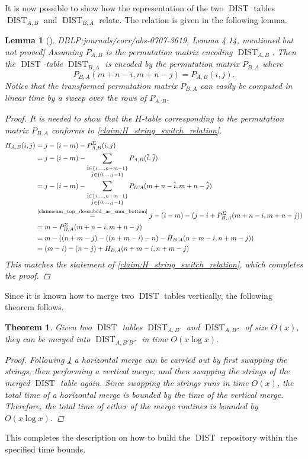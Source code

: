 \documentclass[twoside,11pt,openright]{report}
\newcommand{\DIST}{\operatorname{DIST}}
\newcommand{\refbook}[2]{\cite[#1]{DBLP:journals/corr/abs-0707-3619}, #2}
\newtheorem{lemma}{Lemma}
\newtheorem{theorem}{Theorem}
\begin{document}
%
It is now possible to show how the representation of the two $\DIST$ tables $\DIST_{A,B}$ and $\DIST_{B,A}$ relate. The relation is given in the following lemma.
%
\begin{lemma}[\refbook{p.-52}{Lemma 4.14, mentioned but not proved}]
  \label{lemma:swap_strings}
  Assuming $P_{A,B}$ is the permutation matrix encoding $\DIST_{A,B}$. Then the $\DIST$-table $\DIST_{B,A}$ is encoded by the permutation matrix $P_{B,A}$ where
  \[
    P_{B,A}(m + n - i, m + n - j) = P_{A,B}(i, j).
  \]
  Notice that the transformed permutation matrix $P_{B,A}$ can easily be computed in linear time by a sweep over the rows of $P_{A,B}$.
  \begin{proof}
    It is needed to show that the $H$-table corresponding to the permutation matrix $P_{B,A}$ conforms to \cref{claim:H_string_switch_relation}.
    \begin{align*}
      H_{A,B}(i, j) &= j - (i - m) - P_{A,B}^{\Sigma}(i, j) \\
        &= j - (i - m) - \sum_{\substack{ \hat{i} \in \{i,\dots,n+m - 1\} \\ \hat{j} \in \{0, \dots, j - 1\}}} P_{A,B}(\hat{i}, \hat{j}) \\
        &= j - (i - m) - \sum_{\substack{ \hat{i} \in \{i, \dots, n + m - 1\} \\ \hat{j} \in \{ 0, \dots, j - 1 \}}} P_{B,A}(m + n - \hat{i}, m + n - \hat{j}) \\
        &\overset{\text{\cref{claim:sum_top_described_as_sum_bottom}}}{=} j - (i - m) - (j - i + P_{B,A}^{\Sigma}(m + n - i, m + n - j)) \\
        &= m - P_{B,A}^{\Sigma}(m + n - i, m + n - j) \\
        &= m - \left( (n + m - j) - ((n + m - i) - n) - H_{B,A}(n + m - i, n + m - j) \right) \\
        &= (m - i) - (n - j) + H_{B,A}(n + m - i, n + m - j)
    \end{align*}
    This matches the statement of \cref{claim:H_string_switch_relation}, which completes the proof.
  \end{proof}
\end{lemma}
%
Since it is known how to merge two $\DIST$ tables vertically, the following theorem follows.
\begin{theorem}
  \label{thm:dist-horizontal-merge}
  Given two $\DIST$ tables $\DIST_{A,B'}$ and $\DIST_{A,B''}$ of size $O(x)$, they can be merged into $\DIST_{A,B'B''}$ in time $O(x\log{x})$.
  \begin{proof}
    Following \cref{lemma:swap_strings} a horizontal merge can be carried out by first swapping the strings, then performing a vertical merge, and then swapping the strings of the merged $\DIST$ table again. Since swapping the strings runs in time $O(x)$, the total time of a horizontal merge is bounded by the time of the vertical merge. Therefore, the total time of either of the merge routines is bounded by $O(x\log{x})$.
  \end{proof}
\end{theorem}
This completes the description on how to build the $\DIST$ repository within the specified time bounds.
\end{document}
